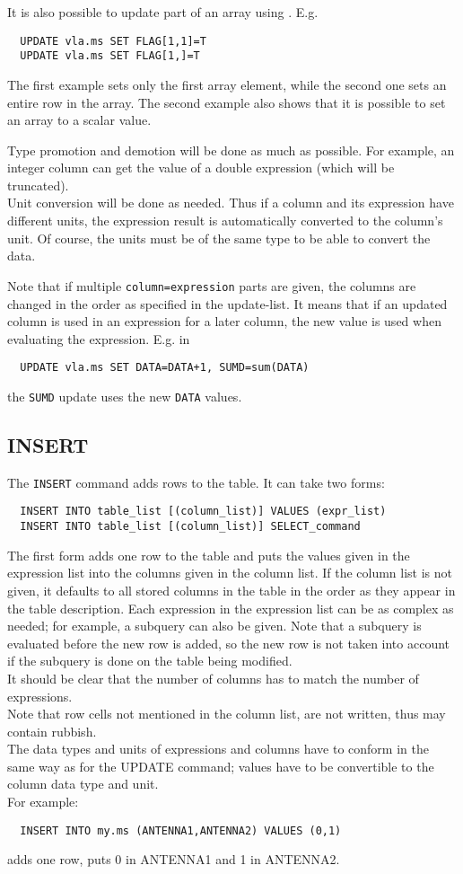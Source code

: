It is also possible to update part of an array using
. E.g.
\begin{verbatim}
  UPDATE vla.ms SET FLAG[1,1]=T
  UPDATE vla.ms SET FLAG[1,]=T
\end{verbatim}
The first example sets only the first array element, while the second
one sets an entire row in the array. The second example also
shows that it is possible to set an array to a scalar value.

Type promotion and demotion will be done as much as possible.
For example, an integer column can get the value of a double
expression (which will be truncated).
\\Unit conversion will be done as needed. Thus if a column and
its expression have different units, the expression result is automatically
converted to the column's unit. Of course, the units must be of the
same type to be able to convert the data.

Note that if multiple \texttt{column=expression} parts are given,
the columns are changed in the order as specified in the update-list.
It means that if an updated column is used in an expression for
a later column, the new value is used when evaluating the
expression. E.g. in
\begin{verbatim}
  UPDATE vla.ms SET DATA=DATA+1, SUMD=sum(DATA)
\end{verbatim}
the \texttt{SUMD} update uses the new \texttt{DATA} values.
    

\subsection{INSERT}
The \texttt{INSERT} command adds rows to the table. It can take two forms:
\begin{verbatim}
  INSERT INTO table_list [(column_list)] VALUES (expr_list)
  INSERT INTO table_list [(column_list)] SELECT_command
\end{verbatim}
The first form adds one row to the table and puts the values given in
the expression list into the columns given in the column list.
If the column list is not given, it defaults to all stored columns in
the table in the order as they appear in the table description.
Each expression in the expression list can be as complex as needed;
for example, a subquery can also be given. Note that a subquery is
evaluated before the new row is added, so the new row is not taken
into account if the subquery is done on the table being modified.
\\It should be clear that the number of columns has to match the
number of expressions.
\\Note that row cells not mentioned in the column list,
are not written, thus may contain rubbish.
\\The data types and units of expressions and columns have to conform in
the same way 
as for the UPDATE command; values have to be convertible
to the column data type and unit.
\\For example:
\begin{verbatim}
  INSERT INTO my.ms (ANTENNA1,ANTENNA2) VALUES (0,1)
\end{verbatim}
adds one row, puts 0 in ANTENNA1 and 1 in ANTENNA2.

